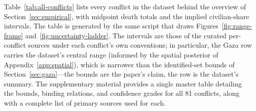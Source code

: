 Table~\ref{tab:all-conflicts} lists every conflict in the dataset behind the overview of Section~\ref{sec:empirical}, with midpoint death totals and the implied civilian-share intervals. The table is generated by the same script that draws Figures~\ref{fig:range-frame} and~\ref{fig:uncertainty-ladder}. The intervals are those of the curated per-conflict sources under each conflict's own conventions; in particular, the Gaza row carries the dataset's central range (informed by the spatial posterior of Appendix~\ref{app:spatial}), which is narrower than the identified-set bounds of Section~\ref{sec:gaza}---the bounds are the paper's claim, the row is the dataset's summary. The supplementary material provides a single master table detailing the bounds, binding relations, and confidence grades for all 81 conflicts, along with a complete list of primary sources used for each.


